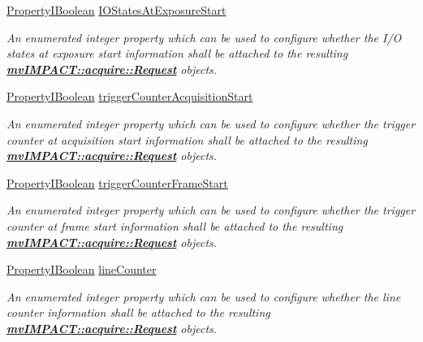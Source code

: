 \begin{DoxyCompactItemize}
\hyperlink{group___common_interface_ga44f9437e24b21b6c93da9039ec6786aa}{Property\+I\+Boolean} \hyperlink{classmv_i_m_p_a_c_t_1_1acquire_1_1_request_info_configuration_aa4df04672e15722bd08592d3332851ed}{I\+O\+States\+At\+Exposure\+Start}
\begin{DoxyCompactList}\small\item\em An enumerated integer property which can be used to configure whether the I/\+O states at exposure start information shall be attached to the resulting {\bfseries \hyperlink{classmv_i_m_p_a_c_t_1_1acquire_1_1_request}{mv\+I\+M\+P\+A\+C\+T\+::acquire\+::\+Request}} objects. \end{DoxyCompactList}\item 
\hyperlink{group___common_interface_ga44f9437e24b21b6c93da9039ec6786aa}{Property\+I\+Boolean} \hyperlink{classmv_i_m_p_a_c_t_1_1acquire_1_1_request_info_configuration_a97b843fd39a639b06422b0a13bfb7eb2}{trigger\+Counter\+Acquisition\+Start}
\begin{DoxyCompactList}\small\item\em An enumerated integer property which can be used to configure whether the trigger counter at acquisition start information shall be attached to the resulting {\bfseries \hyperlink{classmv_i_m_p_a_c_t_1_1acquire_1_1_request}{mv\+I\+M\+P\+A\+C\+T\+::acquire\+::\+Request}} objects. \end{DoxyCompactList}\item 
\hyperlink{group___common_interface_ga44f9437e24b21b6c93da9039ec6786aa}{Property\+I\+Boolean} \hyperlink{classmv_i_m_p_a_c_t_1_1acquire_1_1_request_info_configuration_acf8e8aa2df844e3fe59683c10262af5d}{trigger\+Counter\+Frame\+Start}
\begin{DoxyCompactList}\small\item\em An enumerated integer property which can be used to configure whether the trigger counter at frame start information shall be attached to the resulting {\bfseries \hyperlink{classmv_i_m_p_a_c_t_1_1acquire_1_1_request}{mv\+I\+M\+P\+A\+C\+T\+::acquire\+::\+Request}} objects. \end{DoxyCompactList}\item 
\hyperlink{group___common_interface_ga44f9437e24b21b6c93da9039ec6786aa}{Property\+I\+Boolean} \hyperlink{classmv_i_m_p_a_c_t_1_1acquire_1_1_request_info_configuration_ae37add1f5362b9f266c336e27b424576}{line\+Counter}
\begin{DoxyCompactList}\small\item\em An enumerated integer property which can be used to configure whether the line counter information shall be attached to the resulting {\bfseries \hyperlink{classmv_i_m_p_a_c_t_1_1acquire_1_1_request}{mv\+I\+M\+P\+A\+C\+T\+::acquire\+::\+Request}} objects. \end{DoxyCompactList}\item 

\end{DoxyCompactItemize}
